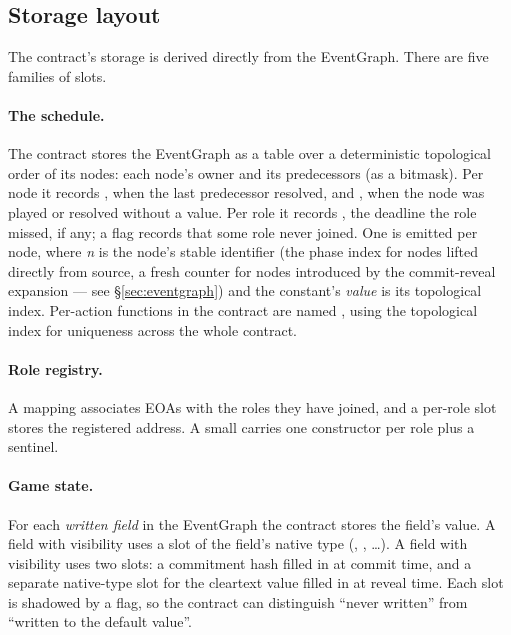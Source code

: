 \subsection{Storage layout}

The contract's storage is derived directly from the EventGraph.
There are five families of slots.

\paragraph{The schedule.}  The contract stores the EventGraph as a
table over a deterministic topological order of its nodes: each
node's owner and its predecessors (as a bitmask).  Per node it
records , when the last predecessor resolved, and
, when the node was played or resolved without a
value.  Per role it records , the deadline the role missed,
if any; a flag  records that some role never joined.  One
 is
emitted per node, where \textit{n} is the node's stable identifier
(the phase index for nodes lifted directly from source, a fresh
counter for nodes introduced by the commit-reveal expansion ---
see \S\ref{sec:eventgraph}) and the constant's \emph{value} is
its topological index.  Per-action functions in the contract are
named , using the
topological index for uniqueness across the whole contract.

\paragraph{Role registry.}  A mapping
 associates EOAs with the roles they
have joined, and a per-role  slot
stores the registered address.  A small  carries one
constructor per role plus a  sentinel.

\paragraph{Game state.}  For each \emph{written field} in the
EventGraph the contract stores the field's value.  A field with
\PUBLIC visibility uses a slot of the field's native type
(, , \ldots).  A field with \COMMIT
visibility uses two slots: a  commitment hash filled
in at commit time, and a separate native-type slot for the
cleartext value filled in at reveal time.  Each slot is
shadowed by a  flag, so the
contract can distinguish ``never written'' from ``written to
the default value''.

